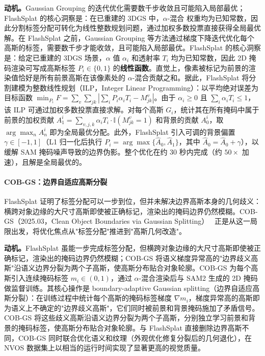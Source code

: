 \textbf{动机。}Gaussian Grouping 的迭代优化需要数千步收敛且可能陷入局部最优；FlashSplat 的核心洞察是：在已重建的 3DGS 中，$\alpha$-混合 权重均为已知常数，因此分割标签分配可转化为线性整数规划问题，通过加权多数投票直接获得全局最优解。在 FlashSplat 之前，Gaussian Grouping 等方法通过梯度下降迭代优化每个高斯的标签，需要数千步才能收敛，且可能陷入局部最优。FlashSplat 的核心洞察是：给定已重建的 3DGS 场景，$\alpha$ 值 $\alpha_i$ 和透射率 $T_i$ 均为已知常数，因此 2D 掩码渲染可写成高斯标签 $P_i \in \{0,1\}$ 的\textbf{线性函数}。直觉上，像素被标记为前景的渲染值恰好是所有前景高斯在该像素处的 $\alpha$-混合贡献之和。据此，FlashSplat 将分割建模为整数线性规划（ILP，Integer Linear Programming）：以平均绝对误差为目标函数 $\min_{P_i} F = \sum_v \sum_{jk} | \sum_i P_i \alpha_i T_i - M_{jk}^v |$。由于 $\alpha_i \geq 0$ 且 $\sum_i \alpha_i T_i \leq 1$，该 ILP 可通过加权多数投票直接求解。对每个高斯 $G_i$，统计其在所有掩码中属于前景的加权贡献 $A_1^i = \sum_{v,j,k} \alpha_i T_i \cdot \mathbb{I}(M_{jk}^v = 1)$ 和背景的贡献 $A_0^i$，取 $\arg\max_n A_n^i$ 即为全局最优分配。此外，FlashSplat 引入可调的背景偏置 $\gamma \in [-1,1]$（L1 归一化后执行 $P_i = \arg\max\{\hat{A}_0, \hat{A}_1\}$，其中 $\hat{A}_0 = \hat{A}_0 + \gamma$），以缓解 SAM 掩码噪声导致的边界伪影。整个优化在约 30 秒内完成（约 $50\times$ 加速），且解是全局最优的。

\paragraph{COB-GS：边界自适应高斯分裂} FlashSplat 证明了标签分配可以一步到位，但并未解决边界高斯本身的几何歧义：横跨对象边缘的大尺寸高斯即使被正确标记，渲染出的掩码边界仍然模糊。COB-GS（2025.03，Clean Object Boundaries via Gaussian Splitting）~\cite{2503_19443} 正是从这一局限出发，将优化焦点从"标签分配"推进到"高斯几何改造"。

\textbf{动机。}FlashSplat 虽能一步完成标签分配，但横跨对象边缘的大尺寸高斯即使被正确标记，渲染出的掩码边界仍然模糊；COB-GS 将语义梯度异常高的"边界歧义高斯"沿语义边界分裂为两个子高斯，使高斯分布贴合对象轮廓。COB-GS 为每个高斯引入连续掩码标签 $m_i \in (0,1)$，通过 $\alpha$-混合渲染后与 SAM2 生成的 2D 掩码做监督训练。其核心操作是 boundary-adaptive Gaussian splitting（边界自适应高斯分裂）：在训练过程中统计每个高斯的掩码标签梯度 $\nabla m_i$，梯度异常高的高斯即为语义上不确定的"边界歧义高斯"，它们同时被前景和背景掩码施加了矛盾信号。COB-GS 将这些歧义高斯沿语义边界分裂为两个子高斯，分别独立学习前景和背景的掩码标签，使高斯分布贴合对象轮廓。与 FlashSplat 直接删除边界高斯不同，COB-GS 同时联合优化语义和纹理（外观优化修复分裂后的几何退化），在 NVOS 数据集上以相当的运行时间实现了显著更高的视觉质量。

